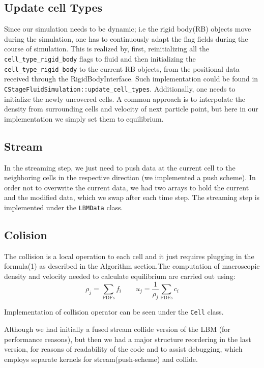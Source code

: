 \subsection *{Update cell Types}
Since our simulation needs to be dynamic; i.e the rigid body(RB) objects move during
the simulation, one has to continuously adapt the flag fields during the course of simulation. This is realized by, first, reinitializing all the \texttt {cell_type_rigid_body} flags to fluid and then initializing the \texttt{cell_type_rigid_body} to the current RB objects, from the positional data
received through the RigidBodyInterface. Such implementation could be found in \texttt{CStageFluidSimulation::update_cell_types}. Additionally, one needs to initialize the newly uncovered cells. A common approach is to interpolate the density from surrounding cells and velocity of next particle point, but here in our implementation we simply set them to equilibrium.
\subsection *{Stream}
 In the streaming step, we just need to push data at the current cell to the neighboring cells in the respective direction (we implemented a push scheme). In order not
 to overwrite the current data, we had two arrays to hold the current and the 
 modified data, which we swap after each time step. The streaming step is implemented under the \texttt{LBMData} class. 
 
 \subsection *{Colision} \label{subsection:collision}
 The collision is a local operation to each cell and it just requires plugging in the formula(1) as described in the Algorithm section.The computation of macroscopic density and velocity needed to calculate equilibrium are carried out using:
 \[\rho_j = \sum_{\mathrm{PDFs}} f_i\qquad u_j = \frac{1}{\rho_j} \sum_\mathrm{PDFs}
 c_i\]
 
  Implementation of collision operator can be seen under the \texttt{Cell} class.
 
 
 Although we had initially a fused stream collide version of the LBM (for performance reasons), but then we had a major structure reordering in the last version, for reasons of readability of the code and to assist debugging, which employs separate kernels for stream(push-scheme) and collide.
 
